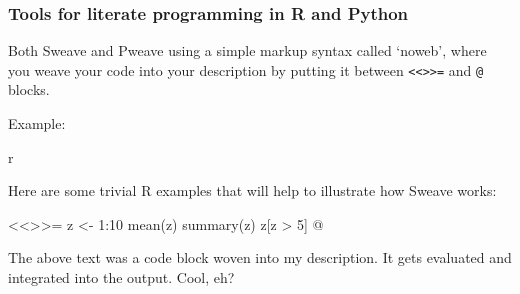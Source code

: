 \documentclass{beamer}
\begin{document}
\begin{frame}[fragile]
  \frametitle{Tools for literate programming in R and Python}

Both Sweave and Pweave using a simple markup syntax called `noweb', where you weave your code into your description by putting it between \verb~<<>>=~ and \verb~@~ blocks.

\smallskip
Example:

\begin{Code}{r}

Here are some trivial R examples that will help to
illustrate how Sweave works:

<<>>=
z <- 1:10
mean(z)
summary(z)
z[z > 5]
@

The above text was a code block woven into my 
description. It gets evaluated and integrated into 
the output. Cool, eh?    
\end{Code}


\end{frame}
\end{document}
